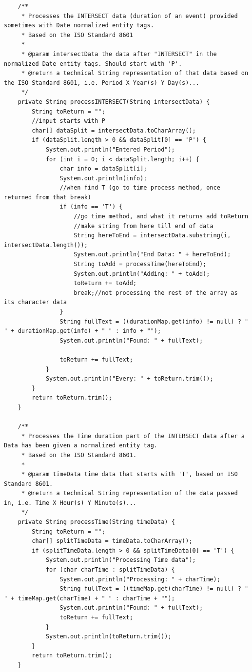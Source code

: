 \begin{lstlisting}
    /**
     * Processes the INTERSECT data (duration of an event) provided sometimes with Date normalized entity tags.
     * Based on the ISO Standard 8601
     *
     * @param intersectData the data after "INTERSECT" in the normalized Date entity tags. Should start with 'P'.
     * @return a technical String representation of that data based on the ISO Standard 8601, i.e. Period X Year(s) Y Day(s)...
     */
    private String processINTERSECT(String intersectData) {
        String toReturn = "";
        //input starts with P
        char[] dataSplit = intersectData.toCharArray();
        if (dataSplit.length > 0 && dataSplit[0] == 'P') {
            System.out.println("Entered Period");
            for (int i = 0; i < dataSplit.length; i++) {
                char info = dataSplit[i];
                System.out.println(info);
                //when find T (go to time process method, once returned from that break)
                if (info == 'T') {
                    //go time method, and what it returns add toReturn
                    //make string from here till end of data
                    String hereToEnd = intersectData.substring(i, intersectData.length());
                    System.out.println("End Data: " + hereToEnd);
                    String toAdd = processTime(hereToEnd);
                    System.out.println("Adding: " + toAdd);
                    toReturn += toAdd;
                    break;//not processing the rest of the array as its character data
                }
                String fullText = ((durationMap.get(info) != null) ? " " + durationMap.get(info) + " " : info + "");
                System.out.println("Found: " + fullText);

                toReturn += fullText;
            }
            System.out.println("Every: " + toReturn.trim());
        }
        return toReturn.trim();
    }

    /**
     * Processes the Time duration part of the INTERSECT data after a Data has been given a normalized entity tag.
     * Based on the ISO Standard 8601.
     *
     * @param timeData time data that starts with 'T', based on ISO Standard 8601.
     * @return a technical String representation of the data passed in, i.e. Time X Hour(s) Y Minute(s)...
     */
    private String processTime(String timeData) {
        String toReturn = "";
        char[] splitTimeData = timeData.toCharArray();
        if (splitTimeData.length > 0 && splitTimeData[0] == 'T') {
            System.out.println("Processing Time data");
            for (char charTime : splitTimeData) {
                System.out.println("Processing: " + charTime);
                String fullText = ((timeMap.get(charTime) != null) ? " " + timeMap.get(charTime) + " " : charTime + "");
                System.out.println("Found: " + fullText);
                toReturn += fullText;
            }
            System.out.println(toReturn.trim());
        }
        return toReturn.trim();
    }


\end{lstlisting}
